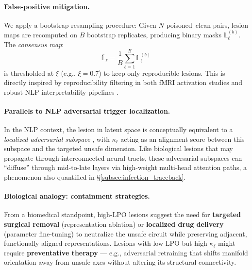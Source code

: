 \documentclass[11pt]{article}
\begin{document}
\paragraph{False-positive mitigation.}
We apply a bootstrap resampling procedure:  
Given $N$ poisoned–clean pairs, lesion maps are recomputed on $B$ bootstrap replicates, producing binary masks $\mathbb{L}_\ell^{(b)}$.  
The \emph{consensus map}:
\[
\overline{\mathbb{L}}_\ell = \frac{1}{B} \sum_{b=1}^B \mathbb{L}_\ell^{(b)}
\]
is thresholded at $\xi$ (e.g., $\xi=0.7$) to keep only reproducible lesions.  
This is directly inspired by reproducibility filtering in both fMRI activation studies \citep{woo2014cluster} and robust NLP interpretability pipelines \citep{feng2018pathologies}.

\paragraph{Parallels to NLP adversarial trigger localization.}
In the NLP context, the lesion in latent space is conceptually equivalent to a \textit{localized adversarial subspace} \citep{wallace2019universal, jiang2020can}, with $\kappa_\ell$ acting as an alignment score between this subspace and the targeted unsafe dimension.  
Like biological lesions that may propagate through interconnected neural tracts, these adversarial subspaces can “diffuse” through mid-to-late layers via high-weight multi-head attention paths, a phenomenon also quantified in \S\ref{subsec:infection_traceback}.

\paragraph{Biological analogy: containment strategies.}
From a biomedical standpoint, high-LPO lesions suggest the need for \textbf{targeted surgical removal} (representation ablation) or \textbf{localized drug delivery} (parameter fine-tuning) to neutralize the unsafe circuit while preserving adjacent, functionally aligned representations.  
Lesions with low LPO but high $\kappa_\ell$ might require \textbf{preventative therapy} — e.g., adversarial retraining that shifts manifold orientation away from unsafe axes without altering its structural connectivity.
\end{document}
